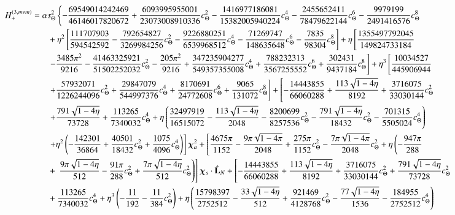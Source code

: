 \documentclass[twocolumn,showpacs,aps,prd,nobibnotes,floatfix]{revtex4-1}
\begin{document}
\begin{widetext}
\begin{subequations}
\begin{align}
	\\
	& H_{+}^{(3,mem)} =\alpha s_{\Theta}^2\left\{-\frac{69549014242469}{46146017820672} + \frac{6093995955001}{23073008910336}c_{\Theta}^2 - \frac{1416977186081}{15382005940224}c_{\Theta}^4-\frac{2455652411}{78479622144}c_{\Theta}^6-\frac{9979199}{2491416576}c_{\Theta}^8\right.\nonumber\\
	&\qquad\qquad\quad + \eta^2\left[\frac{111707903}{594542592} - \frac{792654827}{3269984256}c_{\Theta}^2 -\frac{9226880251}{6539968512}c_{\Theta}^4 - \frac{71269747}{148635648}c_{\Theta}^6-\frac{7835}{98304}c_{\Theta}^8\right] + \eta\left[\frac{1355497792045}{149824733184}\nonumber\right.\\
	&\qquad\qquad\quad \left.- \frac{3485\pi^2}{9216}-\frac{41463325921}{51502252032}c_{\Theta}^2 -\frac{205\pi^2}{9216} + \frac{347235904277}{549357355008}c_{\Theta}^4 + \frac{788232313}{3567255552}c_{\Theta}^6 + \frac{302431}{9437184}c_{\Theta}^8\right]+\eta^3\left[\frac{10034527}{445906944}\right.\nonumber\\
	&\qquad\qquad\quad\left. + \frac{57932071}{1226244096}c_{\Theta}^2 + \frac{29847079}{544997376}c_{\Theta}^4 + \frac{8170691}{24772608}c_{\Theta}^6 + \frac{9065}{131072}c_{\Theta}^8\right] + \left[-\frac{14443855}{66060288}  + \frac{113\sqrt{1-4\eta}}{8192} + \frac{3716075}{33030144}c_{\Theta}^2\right.\nonumber\\
	& \qquad\qquad\quad\left. + \frac{791\sqrt{1-4\eta}}{73728} + \frac{113265}{7340032}c_{\Theta}^4 + \eta\left(\frac{32497919}{16515072} - \frac{113\sqrt{1-4\eta}}{2048} -\frac{8200699}{8257536}c_{\Theta}^2 - \frac{791\sqrt{1-4\eta}}{18432}c_{\Theta}^2 - \frac{701315}{5505024}c_{\Theta}^4\right)\nonumber\right.\\
	& \qquad\qquad\quad\left. + \eta^2\left(-\frac{142301}{36864} + \frac{40501}{18432}c_{\Theta}^2 + \frac{1075}{4096}c_{\Theta}^4\right)\right]\chiaSqr + 
	\left[\frac{4675\pi}{1152}-\frac{9\pi\sqrt{1-4\pi}}{2048} + \frac{275\pi}{1152}c_{\Theta}^2 - \frac{7\pi\sqrt{1-4\pi}}{2048}c_{\Theta}^2 + \eta\left(-\frac{947\pi}{288}\right.\right.\nonumber\\
	& \qquad\qquad\quad + \left.\left.\frac{9\pi\sqrt{1-4\eta}}{512} -\frac{91\pi}{288}c_{\Theta}^2 + \frac{7\pi\sqrt{1-4\eta}}{512}c_{\Theta}^2\right)\right]\chisdL + \left[-\frac{14443855}{66060288} + \frac{113\sqrt{1-4\eta}}{8192} + \frac{3716075}{33030144}c_{\Theta}^2 + \frac{791\sqrt{1-4\eta}}{73728}c_{\Theta}^2\right.\nonumber\\
	& \qquad\qquad\quad + \frac{113265}{7340032}c_{\Theta}^4 + \eta^3\left(-\frac{11}{192} - \frac{11}{384}c_{\Theta}^2\right) + \eta\left(\frac{15798397}{2752512} - \frac{33\sqrt{1-4\eta}}{512} + \frac{921469}{4128768}c_{\Theta}^2 - \frac{77\sqrt{1-4\eta}}{1536} - \frac{184955}{2752512}c_{\Theta}^4\right)\nonumber\\

\end{align}
\end{subequations}
\end{widetext}
\end{document}
